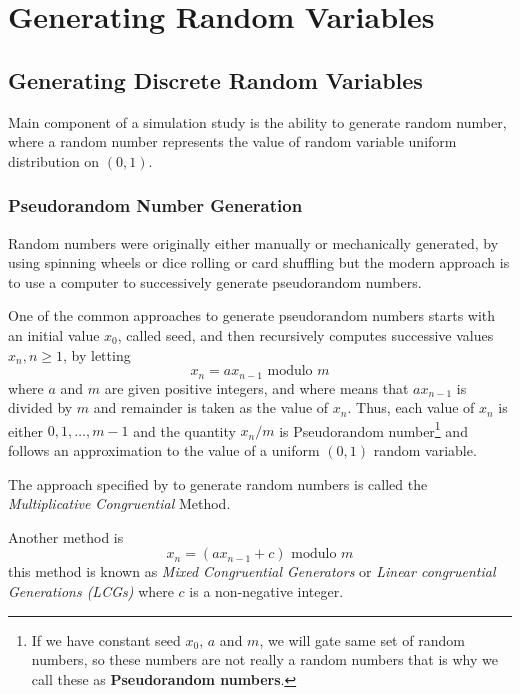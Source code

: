 \chapter{Generating Random Variables}

\section{Generating Discrete Random Variables}

Main component of a simulation study is the ability to generate random number, where a random number represents the value of random variable uniform
distribution on $(0,1)$.
\subsection{Pseudorandom Number Generation}
Random numbers were originally either manually or mechanically generated, by using spinning wheels or dice rolling or card shuffling
but the modern approach is to use a computer to successively generate pseudorandom numbers.

One of the common approaches to generate pseudorandom numbers starts with an initial value $x_0$, called seed, and then recursively computes
successive values $x_n, n\ge1$, by letting
\begin{equation}
	\label{MCM}
	x_n = a x_{n-1} \text{ modulo } m
\end{equation}
where $a$ and $m$ are given positive integers, and where  means that $ax_{n-1}$ is divided by  $m$ and remainder is taken as the
value of $x_n$. Thus, each value of $x_n$ is either $0,1, \ldots, m-1$ and the quantity $x_n / m$ is Pseudorandom number\footnote{If we have constant seed $ x_0 $, $a$ and $ m $, we will gate same set of random numbers, so these numbers are not really a random numbers that is why we call these as \textbf{Pseudorandom numbers}. } and follows
an approximation to the value of a uniform $(0,1)$ random variable.

The approach specified by  to generate random numbers is called the \textit{Multiplicative Congruential} Method.

Another method is
\[
	x_n = (a x_{n-1}+c) \text{ modulo } m
\]
this method is known as \textit{Mixed Congruential Generators} or \textit{Linear congruential Generations (LCGs)} where $c$ is a non-negative integer.

